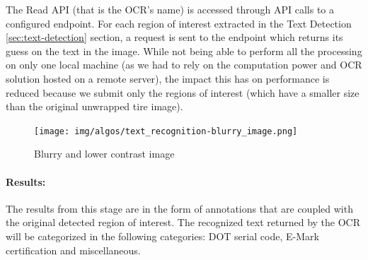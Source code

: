 The Read API (that is the OCR's name) \cite{site:Microsoft_Cognitive_Services-Read_API-OCR} is accessed through API calls to a configured endpoint. For each region of interest extracted in the Text Detection \ref{sec:text-detection} section, a request is sent to the endpoint which returns its guess on the text in the image. While not being able to perform all the processing on only one local machine (as we had to rely on the computation power and OCR solution hosted on a remote server), the impact this has on performance is reduced because we submit only the regions of interest (which have a smaller size than the original unwrapped tire image).

\begin{figure}
    \centering
    \texttt{[image: img/algos/text\_recognition-blurry\_image.png]}
    \caption{Blurry and lower contrast image}
    \label{fig:text_recognition-blurry_image}
\end{figure}

\paragraph*{Results:}\mbox{}\par
The results from this stage are in the form of annotations that are coupled with the original detected region of interest. The recognized text returned by the OCR will be categorized in the following categories: DOT serial code, E-Mark certification and miscellaneous.







